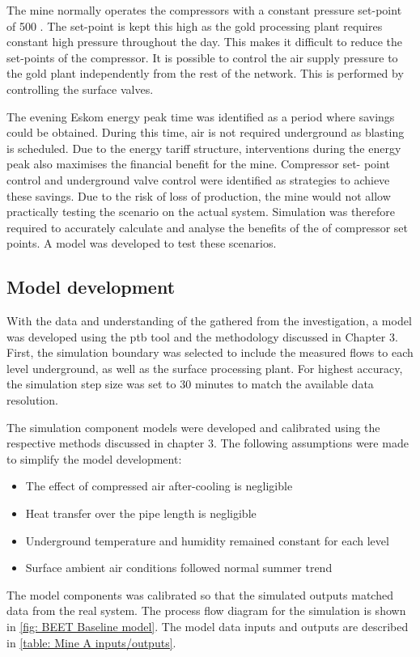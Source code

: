  \par 
 The mine normally operates the compressors with a constant pressure set-point of 500 . The set-point is kept this high as the gold processing plant requires constant high pressure throughout the day. This makes it difficult to reduce the set-points of the compressor. It is possible to control the air supply pressure to the gold plant independently from the rest of the network. This is performed by controlling the surface valves.
 \par 
  The evening Eskom energy peak time was identified as a period where savings could be obtained. During this time, air is not required underground as blasting is scheduled. Due to the energy tariff structure, interventions during the energy peak also maximises the financial benefit for the mine. Compressor set- point control and underground valve control were identified as strategies to achieve these savings. Due to the risk of loss of production, the mine would not allow practically testing the scenario on the actual system. Simulation was therefore required to accurately calculate and analyse the benefits of the of compressor set points. A model was developed to test these scenarios.

\subsection{Model development}
With the data and understanding of the gathered from the investigation, a model was developed using the \gls{ptb} tool and the methodology discussed in Chapter 3. First, the simulation boundary was selected to include the measured flows to each level underground, as well as the surface processing plant. For highest accuracy, the simulation step size was set to 30 minutes to match the available data resolution.
\par
The simulation component models were developed and calibrated using the respective methods discussed in chapter 3. The following assumptions were made to simplify the model development:
\begin{itemize}
	\item The effect of compressed air after-cooling is negligible
	\item Heat transfer over the pipe length is negligible
	\item Underground temperature and humidity remained constant for each level
	\item Surface ambient air conditions followed normal summer trend
\end{itemize} 
The model components was calibrated so that the simulated outputs matched data from the real system. The process flow diagram for the simulation is shown in \cref{fig: BEET Baseline model}. The model data inputs and outputs are described in \cref{table: Mine A inputs/outputs}.

